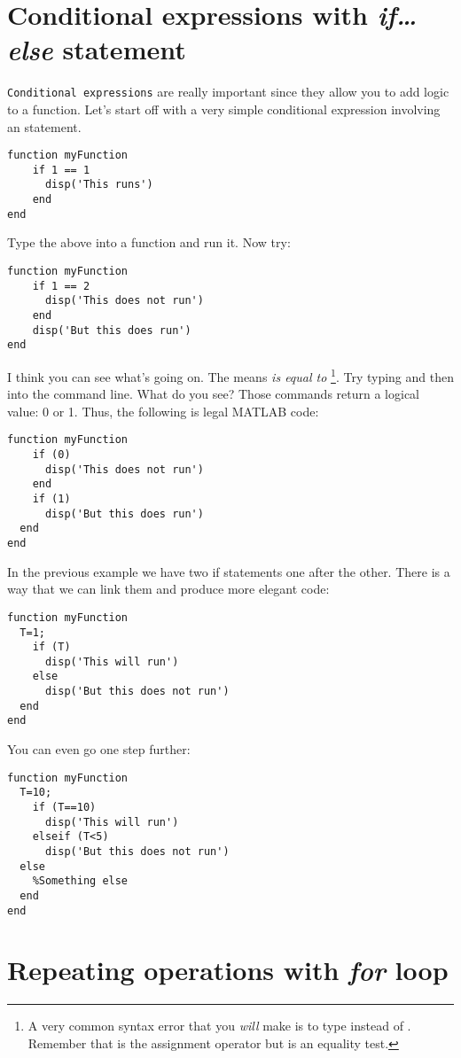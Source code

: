 \documentclass{article}
\begin{document}
\section{Conditional expressions with \emph{if\dots else} statement}

\verb|Conditional expressions| are really important since they allow you to add logic to a function.
Let's start off with a very simple conditional expression involving an  statement.

\begin{lstlisting}
function myFunction
	if 1 == 1
	  disp('This runs')
	end
end
\end{lstlisting}

Type the above into a function and run it. Now try:
\begin{lstlisting}
function myFunction
	if 1 == 2
	  disp('This does not run')
	end
	disp('But this does run')
end
\end{lstlisting}

I think you can see what's going on.
The \mcode{==} means \emph{is equal to}%
\footnote{%
  A very common syntax error that you \textit{will} make is to type  instead of .
  Remember that \mcode{=} is the assignment operator but \mcode{==} is an equality test.
}.
Try typing  and then  into the command line. What do you see?
Those commands return a logical value: 0 or 1.
Thus, the following is legal MATLAB code:
\begin{lstlisting}
function myFunction
	if (0)
	  disp('This does not run')
	end
	if (1)
	  disp('But this does run')
  end
end
\end{lstlisting}

In the previous example we have two if statements one after the other.
There is a way that we can link them and produce more elegant code:
\begin{lstlisting}
function myFunction
  T=1;
	if (T)
	  disp('This will run')
	else
	  disp('But this does not run')
  end
end
\end{lstlisting}

You can even go one step further:
\begin{lstlisting}
function myFunction
  T=10;
	if (T==10)
	  disp('This will run')
	elseif (T<5)
	  disp('But this does not run')
  else
    %Something else
  end
end
\end{lstlisting}


\section{Repeating operations with \emph{for} loop}
\end{document}

